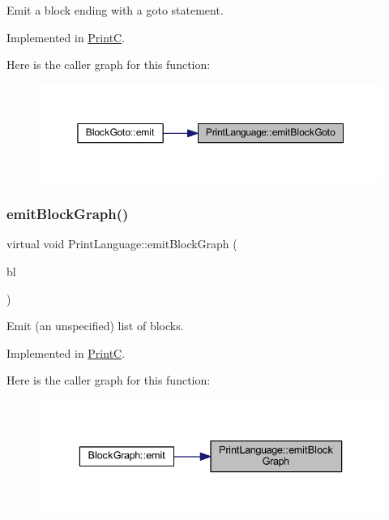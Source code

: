 Emit a block ending with a goto statement. 



Implemented in \mbox{\hyperlink{class_print_c_aa63448aa07e17951dd81712dac58e6d9}{PrintC}}.

Here is the caller graph for this function\+:
\nopagebreak
\begin{figure}[H]
\begin{center}
\leavevmode
\includegraphics[width=350pt]{class_print_language_a12683efc57bffe42726244416e519990_icgraph}
\end{center}
\end{figure}
\mbox{\label{class_print_language_a94a1ee0bbfd7e9791439307d9d5f0a84}} 
\subsubsection{\texorpdfstring{emitBlockGraph()}{emitBlockGraph()}}
{\footnotesize\ttfamily virtual void Print\+Language\+::emit\+Block\+Graph (\begin{DoxyParamCaption}\item[{const \mbox{\hyperlink{class_block_graph}{Block\+Graph}} $\ast$}]{bl }\end{DoxyParamCaption})\hspace{0.3cm}{\ttfamily [pure virtual]}}



Emit (an unspecified) list of blocks. 



Implemented in \mbox{\hyperlink{class_print_c_a44433ba4a36eb79bf55d717b209d0a86}{PrintC}}.

Here is the caller graph for this function\+:
\nopagebreak
\begin{figure}[H]
\begin{center}
\leavevmode
\includegraphics[width=336pt]{class_print_language_a94a1ee0bbfd7e9791439307d9d5f0a84_icgraph}
\end{center}
\end{figure}
\mbox{\label{class_print_language_a33097042b2594c6397b3ced31a3f31b2}} 
